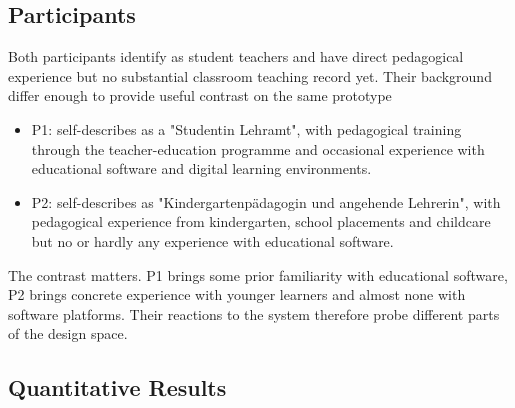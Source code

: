 \subsection{Participants}
Both participants identify as student teachers and have direct pedagogical experience but no substantial classroom 
teaching record yet.
Their background differ enough to provide useful contrast on the same prototype
\begin{itemize}
  \item P1: self-describes as a "Studentin Lehramt", with pedagogical training through the teacher-education 
      programme and occasional experience with educational software and digital learning environments.
  \item P2: self-describes as "Kindergartenpädagogin und angehende Lehrerin", with pedagogical experience from 
  kindergarten, school placements and childcare but no or hardly any experience with educational software.
\end{itemize}

The contrast matters. P1 brings some prior familiarity with educational software, P2 brings concrete experience with 
younger learners and almost none with software platforms. Their reactions to the system therefore probe different 
parts of the design space.

\subsection{Quantitative Results}


